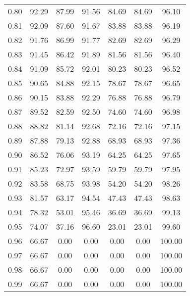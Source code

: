 \begin{tabular}{|c|c|c|c|c|c|c|}
      0.80 &     92.29 &     87.99 &      91.56 &   84.69 &      84.69 &         96.10 \\
      0.81 &     92.09 &     87.60 &      91.67 &   83.88 &      83.88 &         96.19 \\
      0.82 &     91.76 &     86.99 &      91.77 &   82.69 &      82.69 &         96.29 \\
      0.83 &     91.45 &     86.42 &      91.89 &   81.56 &      81.56 &         96.40 \\
      0.84 &     91.09 &     85.72 &      92.01 &   80.23 &      80.23 &         96.52 \\
      0.85 &     90.65 &     84.88 &      92.15 &   78.67 &      78.67 &         96.65 \\
      0.86 &     90.15 &     83.88 &      92.29 &   76.88 &      76.88 &         96.79 \\
      0.87 &     89.52 &     82.59 &      92.50 &   74.60 &      74.60 &         96.98 \\
      0.88 &     88.82 &     81.14 &      92.68 &   72.16 &      72.16 &         97.15 \\
      0.89 &     87.88 &     79.13 &      92.88 &   68.93 &      68.93 &         97.36 \\
      0.90 &     86.52 &     76.06 &      93.19 &   64.25 &      64.25 &         97.65 \\
      0.91 &     85.23 &     72.97 &      93.59 &   59.79 &      59.79 &         97.95 \\
      0.92 &     83.58 &     68.75 &      93.98 &   54.20 &      54.20 &         98.26 \\
      0.93 &     81.57 &     63.17 &      94.54 &   47.43 &      47.43 &         98.63 \\
      0.94 &     78.32 &     53.01 &      95.46 &   36.69 &      36.69 &         99.13 \\
      0.95 &     74.07 &     37.16 &      96.60 &   23.01 &      23.01 &         99.60 \\
      0.96 &     66.67 &      0.00 &       0.00 &    0.00 &       0.00 &        100.00 \\
      0.97 &     66.67 &      0.00 &       0.00 &    0.00 &       0.00 &        100.00 \\
      0.98 &     66.67 &      0.00 &       0.00 &    0.00 &       0.00 &        100.00 \\
      0.99 &     66.67 &      0.00 &       0.00 &    0.00 &       0.00 &        100.00 \\
\bottomrule
\end{tabular}
